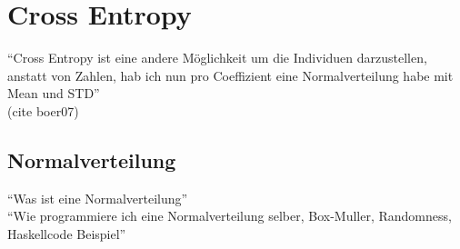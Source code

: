     \section{Cross Entropy}
        ``Cross Entropy ist eine andere Möglichkeit um die Individuen darzustellen, anstatt von Zahlen, hab ich nun pro Coeffizient eine Normalverteilung habe mit Mean und STD'' \\
        (cite boer07)
        \subsection{Normalverteilung}
            ``Was ist eine Normalverteilung'' \\
            ``Wie programmiere ich eine Normalverteilung selber, Box-Muller, Randomness, Haskellcode Beispiel'' \\
